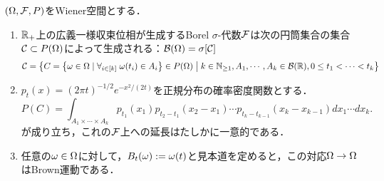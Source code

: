 \documentclass[uplatex,dvipdfmx]{jsreport}
\begin{document}
\begin{proposition}
    $(\Omega,\mathcal{F},P)$をWiener空間とする．
    \begin{enumerate}
        \item $\mathbb{R}_+$上の広義一様収束位相が生成するBorel $\sigma$-代数$\mathcal{F}$は次の円筒集合の集合$\mathcal{C}\subset P(\Omega)$によって生成される：$\mathcal{B}(\Omega)=\sigma[\mathcal{C}]$
        \[\mathcal{C}=\left\{C=\left\{\omega\in\Omega\mid\forall_{i\in[k]}\;\omega(t_i)\in A_i\right\}\in P(\Omega)\;\middle|\;k\in\mathbb{N}_{\ge1},A_1,\cdots,A_k\in\mathcal{B}(\mathbb{R}),0\le t_1<\cdots<t_k\right\}\]
        \item $p_t(x)=(2\pi t)^{-1/2}e^{-x^2/(2t)}$を正規分布の確率密度関数とする．
        \[P(C)=\int_{A_1\times\cdots\times A_k}p_{t_1}(x_1)p_{t_2-t_1}(x_2-x_1)\cdots p_{t_k-t_{k-1}}(x_k-x_{k-1})dx_1\cdots dx_k.\]
        が成り立ち，これの$\mathcal{F}$上への延長はたしかに一意的である．
        \item 任意の$\omega\in\Omega$に対して，$B_t(\omega):=\omega(t)$と見本道を定めると，この対応$\Omega\to\Omega$はBrown運動である．
    \end{enumerate}
\end{proposition}
\end{document}
